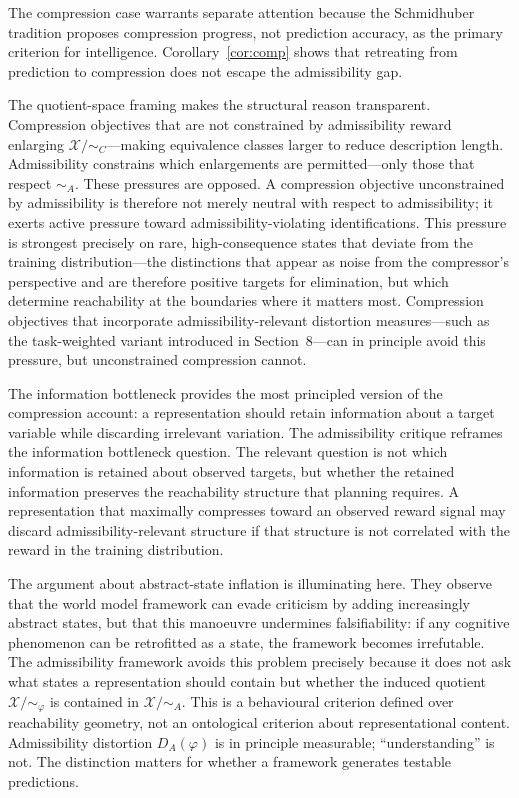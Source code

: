 \documentclass[11pt, a4paper]{article}
\theoremstyle{plain}
\theoremstyle{definition}
\theoremstyle{remark}
\newcommand{\simA}{\sim_A}
\newcommand{\simC}{\sim_C}
\newcommand{\DA}{D_A(\varphi)}
\begin{document}
The compression case warrants separate attention because the Schmidhuber tradition
\citep{schmidhuber1991possibility, schmidhuber2010formal} proposes compression
progress, not prediction accuracy, as the primary criterion for intelligence.
Corollary~\ref{cor:comp} shows that retreating from prediction to compression
does not escape the admissibility gap.

The quotient-space framing makes the structural reason transparent. Compression
objectives that are not constrained by admissibility reward enlarging
$\mathcal{X}/{\simC}$---making equivalence classes larger to reduce description
length. Admissibility constrains which enlargements are permitted---only those
that respect $\simA$. These pressures are opposed. A compression objective
unconstrained by admissibility is therefore not merely neutral with respect
to admissibility; it exerts active pressure toward admissibility-violating
identifications. This pressure is strongest precisely on rare, high-consequence
states that deviate from the training distribution---the distinctions that appear
as noise from the compressor's perspective and are therefore positive targets for
elimination, but which determine reachability at the boundaries where it matters
most. Compression objectives that incorporate admissibility-relevant distortion
measures---such as the task-weighted variant introduced in Section~8---can in
principle avoid this pressure, but unconstrained compression cannot.

The information bottleneck \citep{tishby1999information} provides the most
principled version of the compression account: a representation should retain
information about a target variable while discarding irrelevant variation. The
admissibility critique reframes the information bottleneck question. The relevant
question is not which information is retained about observed targets, but whether
the retained information preserves the reachability structure that planning
requires. A representation that maximally compresses toward an observed reward
signal may discard admissibility-relevant structure if that structure is not
correlated with the reward in the training distribution.

The \citeauthor{gupta2025world} argument about abstract-state inflation is
illuminating here. They observe that the world model framework can evade criticism
by adding increasingly abstract states, but that this manoeuvre undermines
falsifiability: if any cognitive phenomenon can be retrofitted as a state, the
framework becomes irrefutable. The admissibility framework avoids this problem
precisely because it does not ask what states a representation should contain
but whether the induced quotient $\mathcal{X}/{\sim_\varphi}$ is contained in
$\mathcal{X}/{\simA}$. This is a behavioural criterion defined over reachability
geometry, not an ontological criterion about representational content.
Admissibility distortion $\DA$ is in principle measurable; ``understanding''
is not. The distinction matters for whether a framework generates testable
predictions.
\end{document}

